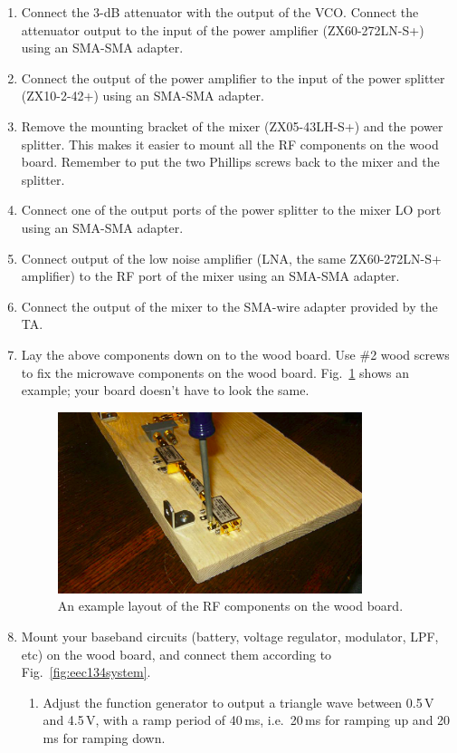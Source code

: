 \documentclass[letterpaper, 11pt]{article}
\begin{document}
\begin{enumerate}
	\item Connect the 3-dB attenuator with the output of the VCO. Connect the attenuator output to the input of the power amplifier (ZX60-272LN-S+) using an SMA-SMA adapter. 
	
	\item Connect the output of the power amplifier to the input of the power splitter (ZX10-2-42+) using an SMA-SMA adapter. 
	
	\item Remove the mounting bracket of the mixer (ZX05-43LH-S+) and the power splitter. This makes it easier to mount all the RF components on the wood board. Remember to put the two Phillips screws back to the mixer and the splitter. %
	
	\item Connect one of the output ports of the power splitter to the mixer LO port using an SMA-SMA adapter.  
	
	\item Connect output of the low noise amplifier (LNA, the same ZX60-272LN-S+ amplifier) to the RF port of the mixer using an SMA-SMA adapter.
	
	\item Connect the output of the mixer to the SMA-wire adapter provided by the TA.
	
	\item Lay the above components down on to the wood board. Use \#2 wood screws to fix the microwave components on the wood board. Fig.~\ref{fig:rf-on-wood} shows an example; your board doesn't have to look the same. 
	
	\begin{figure}[h]
		\centering
		\includegraphics[width=3.5in]{rf-on-wood}
		\caption{An example layout of the RF components on the wood board.}
		\label{fig:rf-on-wood}
	\end{figure} 
	
	\item Mount your baseband circuits (battery, voltage regulator, modulator, LPF, etc) on the wood board, and connect them according to Fig.~\ref{fig:eec134system}. 
		\begin{enumerate}
			\item Adjust the function generator to output a triangle wave between 0.5\,V and 4.5\,V, with a ramp period of 40\,ms, i.e.~20\,ms for ramping up and 20\,ms for ramping down.
		\end{enumerate}
	

\end{enumerate}
\end{document}
